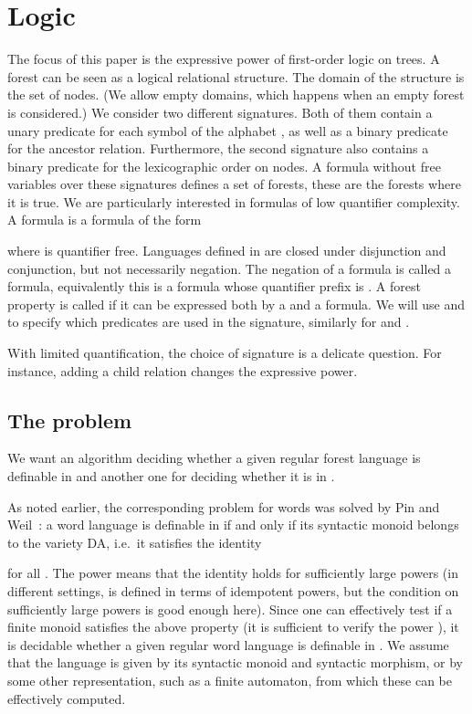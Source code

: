 \documentclass{LMCS}
\begin{document}
\section{Logic}
The focus of this paper is the expressive power of first-order logic
on trees.  A forest can be seen as a logical relational structure.
The domain of the structure is the set of nodes. (We allow empty
domains, which happens when an empty forest  is considered.) We
consider two different signatures. Both of them contain a unary
predicate  for each symbol  of the alphabet , as well as a
binary predicate  for the ancestor relation. Furthermore, the
second signature also contains a binary predicate  for the
lexicographic order on nodes.  A formula without free variables over
these signatures defines a set of forests, these are the forests where
it is true.  We are particularly interested in formulas of low
quantifier complexity.  A  formula is a formula of the form

where  is quantifier free.  Languages defined in 
are closed under disjunction and conjunction, but not necessarily
negation. The negation of a  formula is called a 
formula, equivalently this is a formula whose quantifier prefix is
.  A forest property is called  if it
can be expressed both by a  and a  formula.
We will use \Stwo and \Stwol to specify which predicates are used in
the signature, similarly for  and .

With limited quantification, the choice of signature is a delicate
question. For instance, adding a child relation changes the expressive power.

\subsection{The problem}

We want an algorithm deciding whether a given regular forest language is
definable in \Dtwol and another one for deciding whether it is in \Dtwo.

As noted earlier, the corresponding problem for words was solved by
Pin and Weil~\cite{weilpinpoly}: a word language  is definable in
\Dtwo if and only if its syntactic monoid  belongs to the
variety DA, i.e.~it satisfies the identity

\noindent
for all . The power  means that
the identity holds for sufficiently large powers (in different
settings,  is defined in terms of idempotent powers, but the
condition on sufficiently large powers is good enough here).  Since
one can effectively test if a finite monoid satisfies the above
property (it is sufficient to verify the power ), it is
decidable whether a given regular word language is definable in
\Dtwo. We assume that the language  is given by its syntactic
monoid and syntactic morphism, or by some other representation, such
as a finite automaton, from which these can be effectively computed.
\end{document}
